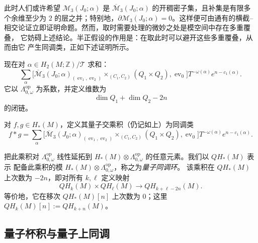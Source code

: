 \begin{remark}
\label{rem:20-multiple-covers}
此时人们或许希望 $\mathcal M_3(J_0;\alpha)$ 是
$\overline{\mathcal M}_3(J_0;\alpha)$ 的开稠密子集，且补集是有限多个余维至少为 $2$
的层之并；特别地，$\partial\mathcal M_3(J_0;\alpha)=0$。这样便可由通有的横截--
相交论证立即证明命题。然而，取\termFiberProduct{}时需要处理的微妙之处是模空间中存在多重覆叠，
它妨碍上述结论。半正假设的作用是：在取此\termFiberProduct{}时可以避开这些多重覆叠，从而由它
产生同调类，正如下述证明所示。
\end{remark}

现在对 $\alpha\in H_2(M;\mathbb Z)/\mathcal T$ 求和：
\[
 \sum_\alpha\bigl[
 \overline{\mathcal M}_3(J_0;\alpha)_{(\operatorname{ev}_1,\operatorname{ev}_2)}
 \times_{(C_1,C_2)}(Q_1\times Q_2),\operatorname{ev}_0\bigr]
 T^{-\omega(\alpha)}e^{n-c_1(\alpha)}.
\]
它以 $\Lambda_{0,\omega}^{\mathrm{op}}$ 为系数，并定义维数为
\begin{equation}
 \dim Q_1+\dim Q_2-2n
 \label{eq:20-quantum-product-dimension}
\end{equation}
的闭链。

\begin{definition}[量子交乘积]
\label{def:20-quantum-intersection-product}
对 $f,g\in H_*(M)$，定义其量子交乘积（仍记如上）为同调类
\begin{equation}
 f*g=\sum_\alpha\bigl[
 \overline{\mathcal M}_3(J_0;\alpha)_{(\operatorname{ev}_1,\operatorname{ev}_2)}
 \times_{(C_1,C_2)}(Q_1\times Q_2),\operatorname{ev}_0\bigr]
 T^{-\omega(\alpha)}e^{n-c_1(\alpha)}.
 \label{eq:20-quantum-intersection-product}
\end{equation}
\end{definition}

把此乘积对 $\Lambda_{0,\omega}^{\mathrm{op}}$ 线性延拓到
$H_*(M)\otimes\Lambda_{0,\omega}^{\mathrm{op}}$ 的任意元素。我们以 $QH_*(M)$ 表示
配备此乘积的模 $H_*(M)\otimes\Lambda_{0,\omega}^{\mathrm{op}}$，称之为\emph{量子同调环}。
该乘积在 $QH_*(M)$ 上次数为 $-2n$，即对所有 $k,\ell$ 定义映射
\begin{equation}
 QH_k(M)\times QH_\ell(M)\longrightarrow QH_{k+\ell-2n}(M).
 \label{eq:20-quantum-homology-degree}
\end{equation}
等价地，它在移次 $QH_*(M)[n]$ 上次数为 $0$；这里
$QH_k(M)[n]:=QH_{k+n}(M)$。

\subsection{量子杯积与量子上同调}

